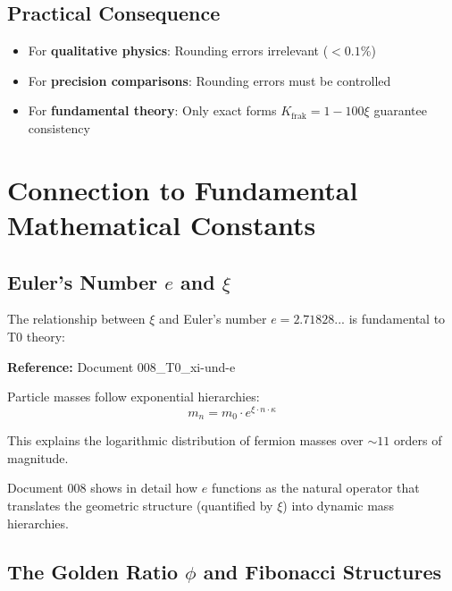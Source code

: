 	\subsection{Practical Consequence}
	
	\begin{itemize}
		\item For \textbf{qualitative physics}: Rounding errors irrelevant ($< 0.1\%$)
		\item For \textbf{precision comparisons}: Rounding errors must be controlled
		\item For \textbf{fundamental theory}: Only exact forms $K_{\text{frak}} = 1 - 100\xi$ guarantee consistency
	\end{itemize}
	
	\section{Connection to Fundamental Mathematical Constants}
	
	\subsection{Euler's Number $e$ and $\xi$}
	
	The relationship between $\xi$ and Euler's number $e = 2.71828...$ is fundamental to T0 theory:
	
	\begin{tcolorbox}[colback=cyan!5!white,colframe=cyan!75!black,title={Exponential Forms in T0}]
		\textbf{Reference:} Document 008\_T0\_xi-und-e
		
		Particle masses follow exponential hierarchies:
		\begin{equation}
			m_n = m_0 \cdot e^{\xi \cdot n \cdot \kappa}
		\end{equation}
		
		This explains the logarithmic distribution of fermion masses over $\sim 11$ orders of magnitude.
		
		Document 008 shows in detail how $e$ functions as the natural operator that translates the geometric structure (quantified by $\xi$) into dynamic mass hierarchies.
	\end{tcolorbox}
	
	\subsection{The Golden Ratio $\phi$ and Fibonacci Structures}
	

